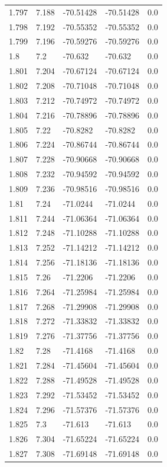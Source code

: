 \begin{tabular}{lllll}
1.797 & 7.188 & -70.51428 & -70.51428 & 0.0 \\
1.798 & 7.192 & -70.55352 & -70.55352 & 0.0 \\
1.799 & 7.196 & -70.59276 & -70.59276 & 0.0 \\
1.8 & 7.2 & -70.632 & -70.632 & 0.0 \\
1.801 & 7.204 & -70.67124 & -70.67124 & 0.0 \\
1.802 & 7.208 & -70.71048 & -70.71048 & 0.0 \\
1.803 & 7.212 & -70.74972 & -70.74972 & 0.0 \\
1.804 & 7.216 & -70.78896 & -70.78896 & 0.0 \\
1.805 & 7.22 & -70.8282 & -70.8282 & 0.0 \\
1.806 & 7.224 & -70.86744 & -70.86744 & 0.0 \\
1.807 & 7.228 & -70.90668 & -70.90668 & 0.0 \\
1.808 & 7.232 & -70.94592 & -70.94592 & 0.0 \\
1.809 & 7.236 & -70.98516 & -70.98516 & 0.0 \\
1.81 & 7.24 & -71.0244 & -71.0244 & 0.0 \\
1.811 & 7.244 & -71.06364 & -71.06364 & 0.0 \\
1.812 & 7.248 & -71.10288 & -71.10288 & 0.0 \\
1.813 & 7.252 & -71.14212 & -71.14212 & 0.0 \\
1.814 & 7.256 & -71.18136 & -71.18136 & 0.0 \\
1.815 & 7.26 & -71.2206 & -71.2206 & 0.0 \\
1.816 & 7.264 & -71.25984 & -71.25984 & 0.0 \\
1.817 & 7.268 & -71.29908 & -71.29908 & 0.0 \\
1.818 & 7.272 & -71.33832 & -71.33832 & 0.0 \\
1.819 & 7.276 & -71.37756 & -71.37756 & 0.0 \\
1.82 & 7.28 & -71.4168 & -71.4168 & 0.0 \\
1.821 & 7.284 & -71.45604 & -71.45604 & 0.0 \\
1.822 & 7.288 & -71.49528 & -71.49528 & 0.0 \\
1.823 & 7.292 & -71.53452 & -71.53452 & 0.0 \\
1.824 & 7.296 & -71.57376 & -71.57376 & 0.0 \\
1.825 & 7.3 & -71.613 & -71.613 & 0.0 \\
1.826 & 7.304 & -71.65224 & -71.65224 & 0.0 \\
1.827 & 7.308 & -71.69148 & -71.69148 & 0.0 \\

\end{tabular}
